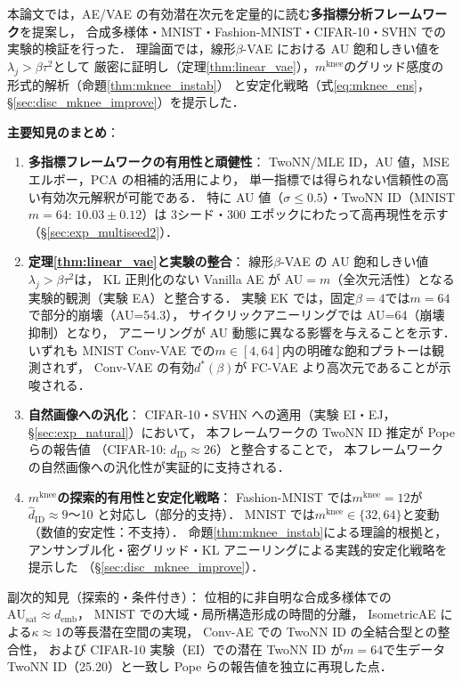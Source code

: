 \documentclass[11pt,a4paper]{jsarticle}
\newcommand{\kap}{\kappa}
\newcommand{\AUsat}{\mathrm{AU}_{\mathrm{sat}}}
\newcommand{\mknee}{m^{\mathrm{knee}}}
\newcommand{\demb}{d_{\mathrm{emb}}}
\begin{document}
本論文では，AE/VAE の有効潜在次元を定量的に読む\textbf{多指標分析フレームワーク}を提案し，
合成多様体・MNIST・Fashion-MNIST・CIFAR-10・SVHN での実験的検証を行った．
理論面では，線形$\beta$-VAE における AU 飽和しきい値を$\lambda_j > \beta\tau^2$として
厳密に証明し（定理\ref{thm:linear_vae}），$\mknee$のグリッド感度の形式的解析（命題\ref{thm:mknee_instab}）
と安定化戦略（式\eqref{eq:mknee_ens}，§\ref{sec:disc_mknee_improve}）を提示した．

\textbf{主要知見のまとめ}：
\begin{enumerate}
  \item \textbf{多指標フレームワークの有用性と頑健性}：
        TwoNN/MLE ID，AU 値，MSE エルボー，PCA の相補的活用により，
        単一指標では得られない信頼性の高い有効次元解釈が可能である．
        特に AU 値（$\sigma \leq 0.5$）・TwoNN ID（MNIST $m=64$: $10.03 \pm 0.12$）は
        3シード・300 エポックにわたって高再現性を示す（§\ref{sec:exp_multiseed2}）．
  \item \textbf{定理\ref{thm:linear_vae}と実験の整合}：
        線形$\beta$-VAE の AU 飽和しきい値$\lambda_j > \beta\tau^2$は，
        KL 正則化のない Vanilla AE が AU$=m$（全次元活性）となる実験的観測（実験 EA）と整合する．
        実験 EK では，固定$\beta=4$では$m=64$で部分的崩壊（AU=54.3），
        サイクリックアニーリングでは AU=64（崩壊抑制）となり，
        アニーリングが AU 動態に異なる影響を与えることを示す．
        いずれも MNIST Conv-VAE での$m \in [4,64]$内の明確な飽和プラトーは観測されず，
        Conv-VAE の有効$d^*(\beta)$が FC-VAE より高次元であることが示唆される．
  \item \textbf{自然画像への汎化}：
        CIFAR-10・SVHN への適用（実験 EI・EJ，§\ref{sec:exp_natural}）において，
        本フレームワークの TwoNN ID 推定が Pope ら\cite{pope2021intrinsic}の報告値
        （CIFAR-10: $d_\mathrm{ID} \approx 26$）と整合することで，
        本フレームワークの自然画像への汎化性が実証的に支持される．
  \item \textbf{$\mknee$の探索的有用性と安定化戦略}：
        Fashion-MNIST では$\mknee = 12$が$\hat{d}_\mathrm{ID} \approx 9$〜10 と対応し（部分的支持）．
        MNIST では$\mknee \in \{32, 64\}$と変動（数値的安定性：不支持）．
        命題\ref{thm:mknee_instab}による理論的根拠と，
        アンサンブル化・密グリッド・KL アニーリングによる実践的安定化戦略を提示した
        （§\ref{sec:disc_mknee_improve}）．
\end{enumerate}

副次的知見（探索的・条件付き）：
位相的に非自明な合成多様体での$\AUsat \approx \demb$，
MNIST での大域・局所構造形成の時間的分離，
IsometricAE による$\kap \approx 1$の等長潜在空間の実現，
Conv-AE での TwoNN ID の全結合型との整合性，
および CIFAR-10 実験（EI）での潜在 TwoNN ID が$m=64$で生データ TwoNN ID（25.20）と一致し
Pope ら\cite{pope2021intrinsic}の報告値を独立に再現した点．
\end{document}
